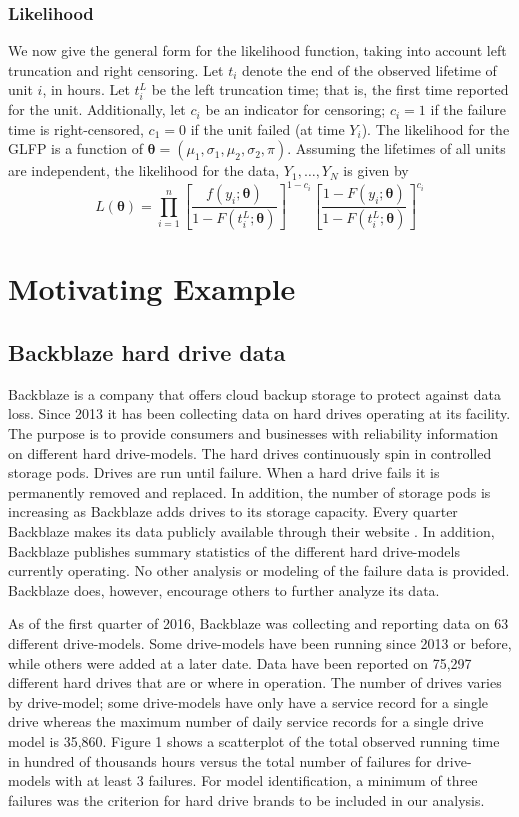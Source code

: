\documentclass[12pt]{article}
\begin{document}
\subsubsection{Likelihood}
We now give the general form for the likelihood function, taking into account left truncation and right censoring.  Let $t_{i}$ denote the end of the observed lifetime of unit $i$, in hours.  Let $t_i^L$ be the left truncation time; that is, the first time reported for the unit.  Additionally, let $c_i$ be an indicator for censoring; $c_i=1$ if the failure time is right-censored, $c_1=0$ if the unit failed (at time $Y_i$). The likelihood for the GLFP is a function of $\bm{\theta} = (\mu_1, \sigma_1, \mu_2, \sigma_2, \pi)$.  Assuming the lifetimes of all units are independent, the likelihood for the data, $Y_1,\ldots,Y_N$ is given by
\begin{equation*}
L(\bm{\theta})= \prod_{i=1}^{n} \left[\frac{f(y_i;\bm{\theta})}{1-F(t_i^L;\bm{\theta})}\right]^{1-c_i} \left[ \frac{1-F(y_i;\bm{\theta})}{1-F(t_i^L;\bm{\theta})} \right]^{c_i}
\end{equation*}

\section{Motivating Example}
\subsection{Backblaze hard drive data}
\label{sec:Data}
Backblaze is a company that offers cloud backup storage to protect against data loss.  Since 2013 it has been collecting data on hard drives operating at its facility.  The purpose is to provide consumers and businesses with reliability information on different hard drive-models.  The hard drives continuously spin in controlled storage pods.  Drives are run until failure.  When a hard drive fails it is permanently removed and replaced.  In addition, the number of storage pods is increasing as Backblaze adds drives to its storage capacity.  Every quarter Backblaze makes its data publicly available through their website \cite{backblaze}. In addition, Backblaze publishes summary statistics of the different hard drive-models currently operating.  No other analysis or modeling of the failure data is provided.  Backblaze does, however, encourage others to further analyze its data. 

As of the first quarter of 2016, Backblaze was collecting and reporting data on 63 different drive-models.  Some drive-models have been running since 2013 or before, while others were added at a later date.  Data have been reported on 75,297 different hard drives that are or where in operation.  The number of drives varies by drive-model; some drive-models have only have a service record for a single drive whereas the maximum number of daily service records for a single drive model is 35,860.  Figure 1 shows a scatterplot of the total observed running time in hundred of thousands hours versus the total number of failures for drive-models with at least 3 failures.  For model identification, a minimum of three failures was the criterion for hard drive brands to be included in our analysis.  
\end{document}
